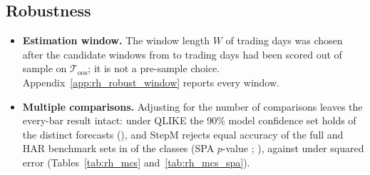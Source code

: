 
\subsection{Robustness}
\label{sec:rh_results_robust}
\begin{itemize}
\item \textbf{Estimation window.} The window length $W$ of \rhorWindowDays{} trading days was chosen after the
  \rhwsNWinWord{} candidate windows from \rhwsWinMin{} to \rhrbWinLong{} trading days had been
  scored out of sample on $\mathcal T_{\mathrm{oos}}$; it is not a pre-sample choice. Appendix~\ref{app:rh_robust_window}
  reports every window.
\item \textbf{Multiple comparisons.} Adjusting for the number of comparisons leaves the every-bar result intact: under
  QLIKE the 90\% model confidence set \citep{HansenLundeNason2011} holds \rhmcsBarQlikeTmaxNNinety{} of the
  \rhmcsNModels{} distinct forecasts (\rhmcsBarQlikeTmaxSetNinety), and StepM \citep{RomanoWolf2005} rejects
  equal accuracy of the full and HAR benchmark sets in \rhmcsBarQAfNRej{} of the \rhmcsNAlt{} classes (SPA
  $p$-value \rhmcsBarQAfSpaC; \citealp{Hansen2005}), against \rhmcsBarMAfNRejWord{} under squared error
  (Tables~\ref{tab:rh_mcs} and~\ref{tab:rh_mcs_spa}).
\end{itemize}
